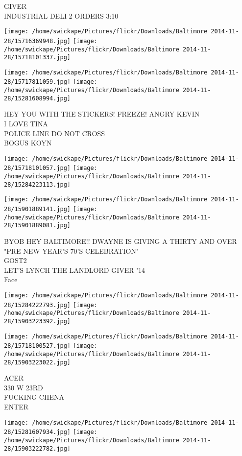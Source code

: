 \documentclass[10pt,letterpaper]{article}
\begin{document}
GIVER\\
INDUSTRIAL DELI 2 ORDERS 3:10
\pagebreak

\texttt{[image: /home/swickape/Pictures/flickr/Downloads/Baltimore 2014-11-28/15716369948.jpg]}
\texttt{[image: /home/swickape/Pictures/flickr/Downloads/Baltimore 2014-11-28/15718101337.jpg]}

\texttt{[image: /home/swickape/Pictures/flickr/Downloads/Baltimore 2014-11-28/15717811059.jpg]}
\texttt{[image: /home/swickape/Pictures/flickr/Downloads/Baltimore 2014-11-28/15281608994.jpg]}

HEY YOU WITH THE STICKERS!  FREEZE!  ANGRY KEVIN\\
I LOVE TINA\\
POLICE LINE DO NOT CROSS\\
BOGUS KOYN
\pagebreak

\texttt{[image: /home/swickape/Pictures/flickr/Downloads/Baltimore 2014-11-28/15718101057.jpg]}
\texttt{[image: /home/swickape/Pictures/flickr/Downloads/Baltimore 2014-11-28/15284223113.jpg]}

\texttt{[image: /home/swickape/Pictures/flickr/Downloads/Baltimore 2014-11-28/15901889141.jpg]}
\texttt{[image: /home/swickape/Pictures/flickr/Downloads/Baltimore 2014-11-28/15901889081.jpg]}

BYOB HEY BALTIMORE!! DWAYNE IS GIVING A THIRTY AND OVER "PRE{-}NEW YEAR'S 70'S CELEBRATION"\\
GOST2\\
LET'S LYNCH THE LANDLORD GIVER '14\\
Face
\pagebreak

\texttt{[image: /home/swickape/Pictures/flickr/Downloads/Baltimore 2014-11-28/15284222793.jpg]}
\texttt{[image: /home/swickape/Pictures/flickr/Downloads/Baltimore 2014-11-28/15903223392.jpg]}

\texttt{[image: /home/swickape/Pictures/flickr/Downloads/Baltimore 2014-11-28/15718100527.jpg]}
\texttt{[image: /home/swickape/Pictures/flickr/Downloads/Baltimore 2014-11-28/15903223022.jpg]}

ACER\\
330 W 23RD\\
FUCKING CHENA\\
ENTER
\pagebreak

\texttt{[image: /home/swickape/Pictures/flickr/Downloads/Baltimore 2014-11-28/15281607934.jpg]}
\texttt{[image: /home/swickape/Pictures/flickr/Downloads/Baltimore 2014-11-28/15903222782.jpg]}
\end{document}
